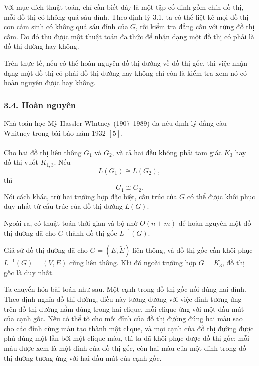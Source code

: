 \documentclass[11pt]{article}
\begin{document}

Với mục đích thuật toán, chỉ cần biết đây là một tập cố định gồm chín đồ thị,
mỗi đồ thị có không quá sáu đỉnh. Theo định lý 3.1, ta có thể liệt kê mọi đồ
thị con cảm sinh có không quá sáu đỉnh của \(G\), rồi kiểm tra đẳng cấu với
từng đồ thị cấm. Do đó thu được một thuật toán đa thức để nhận dạng một đồ thị
có phải là đồ thị đường hay không.

Trên thực tế, nếu có thể hoàn nguyên đồ thị đường về đồ thị gốc, thì việc nhận
dạng một đồ thị có phải đồ thị đường hay không chỉ còn là kiểm tra xem nó có
hoàn nguyên được hay không.

\subsubsection*{3.4. Hoàn nguyên}

Nhà toán học Mỹ Hassler Whitney (1907--1989) đã nêu định lý đẳng cấu Whitney
trong bài báo năm 1932 \([5]\).

\paragraph{}
Cho hai đồ thị liên thông \(G_1\) và \(G_2\), và cả hai đều không phải tam giác
\(K_3\) hay đồ thị vuốt \(K_{1,3}\). Nếu
\[
  L(G_1)\cong L(G_2),
\]
thì
\[
  G_1\cong G_2.
\]
Nói cách khác, trừ hai trường hợp đặc biệt, cấu trúc của \(G\) có thể được khôi
phục duy nhất từ cấu trúc của đồ thị đường \(L(G)\).

Ngoài ra, có thuật toán thời gian và bộ nhớ \(O(n+m)\) để hoàn nguyên một đồ
thị đường đã cho \(G\) thành đồ thị gốc \(L^{-1}(G)\).

Giả sử đồ thị đường đã cho \(G=(E,\widetilde E)\) liên thông, và đồ thị gốc cần
khôi phục \(L^{-1}(G)=(V,E)\) cũng liên thông. Khi đó ngoài trường hợp
\(G=K_3\), đồ thị gốc là duy nhất.

Ta chuyển hóa bài toán như sau. Một cạnh trong đồ thị gốc nối đúng hai đỉnh.
Theo định nghĩa đồ thị đường, điều này tương đương với việc đỉnh tương ứng trên
đồ thị đường nằm đúng trong hai clique, mỗi clique ứng với một đầu mút của cạnh
gốc. Nếu có thể tô cho mỗi đỉnh của đồ thị đường đúng hai màu sao cho các đỉnh
cùng màu tạo thành một clique, và mọi cạnh của đồ thị đường được phủ đúng một
lần bởi một clique màu, thì ta đã khôi phục được đồ thị gốc: mỗi màu được xem
là một đỉnh của đồ thị gốc, còn hai màu của một đỉnh trong đồ thị đường tương
ứng với hai đầu mút của cạnh gốc.
\end{document}
